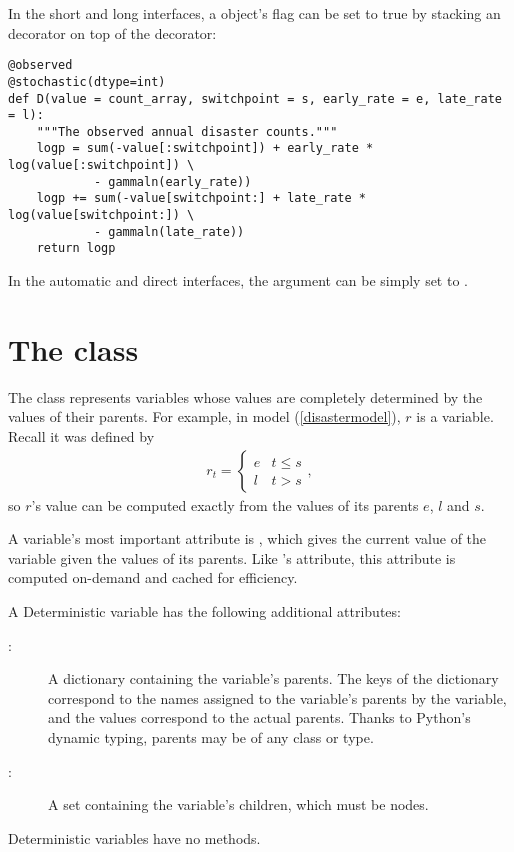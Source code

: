 In the short and long interfaces, a  object's  flag can be set to true by stacking an  decorator on top of the  decorator:
\begin{verbatim}
@observed
@stochastic(dtype=int)
def D(value = count_array, switchpoint = s, early_rate = e, late_rate = l):
    """The observed annual disaster counts."""
    logp = sum(-value[:switchpoint]) + early_rate * log(value[:switchpoint]) \
            - gammaln(early_rate))
    logp += sum(-value[switchpoint:] + late_rate * log(value[switchpoint:]) \
            - gammaln(late_rate))
    return logp
\end{verbatim}
In the automatic and direct interfaces, the  argument can be simply set to .


\hypertarget{deterministic}{}
\section*[The Deterministic class]{The  class} \label{deterministic}

The \code{Deterministic} class represents variables whose values are completely determined by the values of their parents. For example, in model (\ref{disastermodel}), $r$ is a  variable. Recall it was defined by
\begin{eqnarray*}
    r_t=\left\{\begin{array}{ll}
        e & t\le s\\ l & t>s
        \end{array}\right.,
\end{eqnarray*}
so $r$'s value can be computed exactly from the values of its parents $e$, $l$ and $s$.

A \code{deterministic} variable's most important attribute is \code{\bfseries value}, which gives the current value of the variable given the values of its parents. Like 's  attribute, this attribute is computed on-demand and cached for efficiency.

A Deterministic variable has the following additional attributes:
\begin{description}
    \item[\code{parents}:] A dictionary containing the variable's parents. The keys of the dictionary correspond to the names assigned to the variable's parents by the variable, and the values correspond to the actual parents. Thanks to Python's dynamic typing, parents may be of any class or type.
    \item[:] A set containing the variable's children, which must be nodes.
\end{description}
Deterministic variables have no methods.


